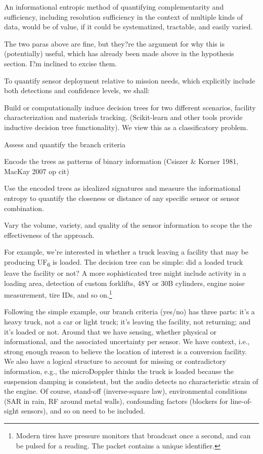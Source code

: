 \documentclass{article} %
\begin{document}
An informational entropic method of quantifying complementarity and sufficiency, including resolution sufficiency in the context of multiple kinds of data, would be of value, if it could be systematized, tractable, and easily varied.

{\color {red} The two paras above are fine, but they?re the argument for why this is (potentially) useful, which has already been made above in the hypothesis section. I?m inclined to excise them.}
 
To quantify sensor deployment relative to mission needs, which explicitly include both detections and confidence levels, we shall:

\begin{enumerate*}
\item Build or computationally induce decision trees for two different scenarios, facility characterization and materials tracking. (Scikit-learn and other tools provide inductive decision tree functionality). We view this as a classificatory problem.
\item Assess and quantify the branch criteria
\item Encode the trees as patterns of binary information (Csiszer \& Korner 1981, MacKay 2007 op cit)
\item Use the encoded trees as idealized signatures and measure the informational entropy to quantify the closeness or distance of any specific sensor or sensor combination.
\item Vary the volume, variety, and quality of the sensor information to scope the the effectiveness of the approach.
\end{enumerate*}

For example, we're interested in whether a truck leaving a facility that may be producing UF\textsubscript{6} is loaded. The decision tree can be simple: did a loaded truck leave the facility or not? A more sophisticated tree might include activity in a loading area, detection of custom forklifts, 48Y or 30B cylinders, engine noise measurement, tire IDs, and so on.\footnote{ Modern tires have pressure monitors that broadcast once a second, and can be pulsed for a reading. The packet contains a unique identifier.}

Following the simple example, our branch criteria (yes/no) has three parts: it's a heavy truck, not a car or light truck; it's leaving the facility, not returning; and it's loaded or not. Around that we have sensing, whether physical or informational, and the associated uncertainty per sensor. We have context, i.e., strong enough reason to believe the location of interest is a conversion facility. We also have a logical structure to account for missing or contradictory information, e.g., the microDoppler thinks the truck is loaded because the suspension damping is consistent, but the audio detects no characteristic strain of the engine. Of course, stand-off (inverse-square law), environmental conditions (SAR in rain, RF around metal walls), confounding factors (blockers for line-of-sight sensors), and so on need to be included. 
\end{document}
